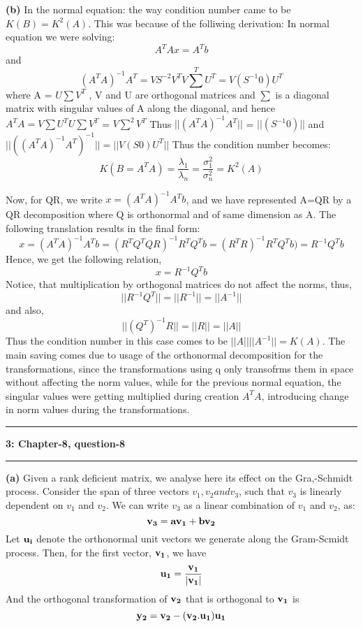 \documentclass{article}
\newcommand\question[2]{\vspace{.25in}\hrule\textbf{#1: #2}\hrule\vspace{.10in}}
\renewcommand\part[1]{\vspace{.10in}\textbf{(#1)}}
\begin{document}
\part{b} In the normal equation: the way condition number came to be $K(B) = K^2(A)$. This was because of the folliwing derivation: \newline
In normal equation we were solving: 
\[A^TAx = A^Tb\] and
\[ (A^TA)^{-1}A^T = VS^{-2}V^T V\sum^{T}U^T = V(S^{-1} 0)U^T\]
where A = $U\sum V^T$ , V and U are orthogonal matrices and $\sum$ is a diagonal matrix with singular values of A along the diagonal, and hence $A^TA = V\sum U^T U\sum V^T$ = $V \sum^2 V^T$ \newline
Thus $||(A^TA)^{-1}A^T||$ = $||(S^{-1} 0)||$ and $||((A^TA)^{-1}A^T)^{-1}|| = ||V(S 0)U^T||$\newline
Thus the condition number becomes: \newline
 \[K(B=A^TA) = \dfrac{\lambda_1}{\lambda_n} = \dfrac{\sigma_{1}^2}{\sigma_{n}^2} = K^2(A)\]

Now, for QR, we write $x = (A^TA)^{-1}A^T b $, and we have represented A=QR by a QR decomposition where Q is orthonormal and of same dimension as A. The following translation results in the final form: \newline
	\[x = (A^TA)^{-1}A^T b = (R^TQ^TQR)^{-1}R^TQ^Tb = (R^TR)^{-1}R^TQ^Tb) = R^{-1}Q^Tb\]
	Hence, we get the following relation,
	\[ x = R^{-1}Q^Tb\]
	Notice, that multiplication by orthogonal matrices do not affect the norms, thus,
	\[||R^{-1}Q^T|| = ||R^{-1}|| = ||A^{-1}||\]
	and also, 
	\[||(Q^T)^{-1}R|| = ||R|| = ||A||\]
	Thus the condition number in this case comes to be $||A||||A^{-1}|| = K(A)$. \newline
	The main saving comes due to usage of the orthonormal decomposition for the transformations, since the transformations using q only transofrms them in space without affecting the norm values, while for the previous normal equation, the singular values were getting multiplied during creation $A^TA$, introducing change in norm values during the transformations. \newline

\question{3}{Chapter-8, question-8}
 \part{a} Given a rank deficient matrix, we analyse here its effect on the Gra,-Schmidt process. Consider the span of three vectors $v_1, v_2 and v_3$, such that $v_3$ is linearly dependent on $v_1$ and $v_2$. We can write $v_3$ as a linear combination of $v_1$ and $v_2$, as: \newline
 \[\bf v_3 = a\bf v_1 + b\bf v_2\]
 Let $\bf u_i$ denote the orthonormal unit vectors we generate along the Gram-Scmidt process. Then, for the first vector, $\bf v_1$, we have 
 \[\bf u_1 = \dfrac{\bf v_1}{|\bf v_1|}\]
 And the orthogonal transformation of $\bf v_2$ that is orthogonal to $\bf v_1$ is
 \[ \bf y_2 = \bf v_2 - (\bf v_2.\bf u_1)\bf u_1\]
\end{document}
